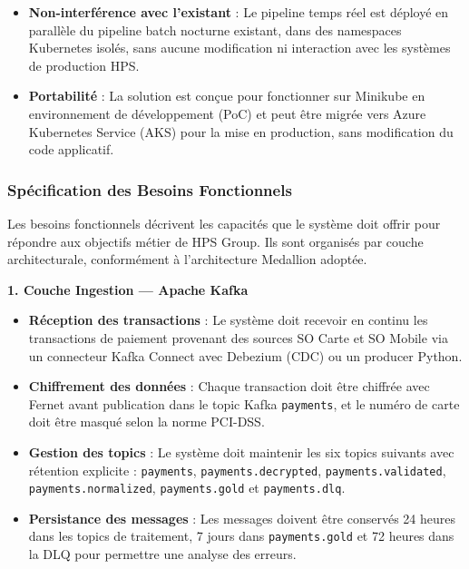 \begin{itemize}[leftmargin=1.5cm]
    \item \textbf{Non-interférence avec l'existant} : Le pipeline temps réel est déployé en parallèle du pipeline batch nocturne existant, dans des namespaces Kubernetes isolés, sans aucune modification ni interaction avec les systèmes de production HPS.

    \item \textbf{Portabilité} : La solution est conçue pour fonctionner sur Minikube en environnement de développement (PoC) et peut être migrée vers Azure Kubernetes Service (AKS) pour la mise en production, sans modification du code applicatif.

\end{itemize}

\newpage

\subsubsection{Spécification des Besoins Fonctionnels}
\vspace{0.3cm}

Les besoins fonctionnels décrivent les capacités que le système doit offrir pour répondre aux objectifs métier de HPS Group. Ils sont organisés par couche architecturale, conformément à l'architecture Medallion adoptée.

\vspace{0.3cm}
\textbf{1. Couche Ingestion --- Apache Kafka}

\begin{itemize}[leftmargin=1.5cm]
    \item \textbf{Réception des transactions} : Le système doit recevoir en continu les transactions de paiement provenant des sources SO Carte et SO Mobile via un connecteur Kafka Connect avec Debezium (CDC) ou un producer Python.
    \item \textbf{Chiffrement des données} : Chaque transaction doit être chiffrée avec Fernet avant publication dans le topic Kafka \texttt{payments}, et le numéro de carte doit être masqué selon la norme PCI-DSS.
    \item \textbf{Gestion des topics} : Le système doit maintenir les six topics suivants avec rétention explicite : \texttt{payments}, \texttt{payments.decrypted}, \texttt{payments.validated}, \texttt{payments.normalized}, \texttt{payments.gold} et \texttt{payments.dlq}.
    \item \textbf{Persistance des messages} : Les messages doivent être conservés 24 heures dans les topics de traitement, 7 jours dans \texttt{payments.gold} et 72 heures dans la DLQ pour permettre une analyse des erreurs.
\end{itemize}

